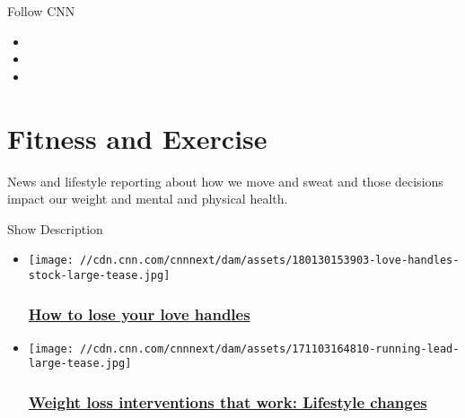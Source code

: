 Follow CNN

\begin{itemize}
\item
\item
\item
\end{itemize}

\hypertarget{fitness-and-exercise}{%
\section{Fitness and Exercise}\label{fitness-and-exercise}}

News and lifestyle reporting about how we move and sweat and those
decisions impact our weight and mental and physical health.

Show Description

\begin{itemize}
\item
  \href{/2018/02/01/health/love-handles-exercise-jampolis/index.html}{}

  \texttt{[image: //cdn.cnn.com/cnnnext/dam/assets/180130153903-love-handles-stock-large-tease.jpg]}

  \hypertarget{how-to-lose-your-love-handles}{%
  \subsubsection{\texorpdfstring{\href{/2018/02/01/health/love-handles-exercise-jampolis/index.html}{How
  to lose your love
  handles}}{How to lose your love handles}}\label{how-to-lose-your-love-handles}}
\end{itemize}

\begin{itemize}
\item
  \href{/2018/02/07/health/weight-loss-food-exercise-drayer/index.html}{}

  \texttt{[image: //cdn.cnn.com/cnnnext/dam/assets/171103164810-running-lead-large-tease.jpg]}

  \hypertarget{weight-loss-interventions-that-work-lifestyle-changes-}{%
  \subsubsection{\texorpdfstring{\href{/2018/02/07/health/weight-loss-food-exercise-drayer/index.html}{Weight
  loss interventions that work: Lifestyle changes
  }}{Weight loss interventions that work: Lifestyle changes }}\label{weight-loss-interventions-that-work-lifestyle-changes-}}
\end{itemize}

